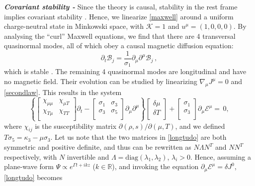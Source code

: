 \documentclass[a4paper, amsfonts, amssymb, amsmath, reprint, showkeys, nofootinbib, twoside,notitlepage]{revtex4-1}
\newcommand{\K}{{\mathcal{K}}}
\theoremstyle{definition}
\theoremstyle{theorem}
\begin{document}
\noindent\textit{\bf Covariant stability -} Since the theory is causal, stability in the rest frame implies covariant stability \cite{GavassinoSuperlum2021,GavassinoBounds2023myj}. Hence, we linearize \eqref{maxwell} around a uniform charge-neutral state in Minkowski space, with $\K{=}1$ and $u^\mu{=}(1,0,0,0)$. By analysing the ``curl'' Maxwell equations, we find that there are 4 transversal quasinormal modes, all of which obey a causal magnetic diffusion equation:
\begin{equation}\label{magneticdiffusion}
\partial_t \mathcal{B}_j =\dfrac{1}{\sigma_1}\partial_\mu \partial^\mu \mathcal{B}_j \, ,
\end{equation}
which is stable \cite{GavassinoBounds2023myj}. The remaining 4 quasinormal modes are longitudinal and have no magnetic field. 
Their evolution can be studied by linearizing $\nabla_\mu J^\mu=0$ and \eqref{secondlaw}. This results in the system
\begin{equation}\label{longtudo}
\left\{ \!
\begin{bmatrix}
\chi_{\mu \mu} & \chi_{\mu T} \\
\chi_{T\mu} & \chi_{TT} \\
\end{bmatrix}\!\partial_t{-}\!
\begin{bmatrix}
\sigma_1 & \sigma_3 \\
\sigma_3 & \sigma_5 \\
\end{bmatrix}\! \partial_\mu \partial^\mu 
\right\}\!
\begin{bmatrix}
\delta \mu \\
\delta T \\
\end{bmatrix}
{+}
\begin{bmatrix}
\sigma_1\\
\sigma_3\\
\end{bmatrix} \!
\partial_\mu \mathcal{E}^\mu
{=}\,0,
\end{equation}
where $\chi_{ij}$ is the susceptibility matrix $\partial(\rho,s)/\partial(\mu,T)$, and we defined $T\sigma_5=\kappa_3{-}\mu\sigma_3$. Let us note that the two matrices in \eqref{longtudo} are both symmetric and positive definite, and thus can be rewritten as $N\Lambda N^T$ and $NN^T$ respectively, with $N$ invertible and $\Lambda=\text{diag}(\lambda_1,\lambda_2)$, $\lambda_i>0$. Hence, assuming a plane-wave form $\Psi \propto e^{\Gamma t+ikz}$ ($k\in \mathbb{R}$), and invoking the equation $\partial_\mu \mathcal{E}^\mu=\delta J^0$, \eqref{longtudo} becomes
\end{document}

